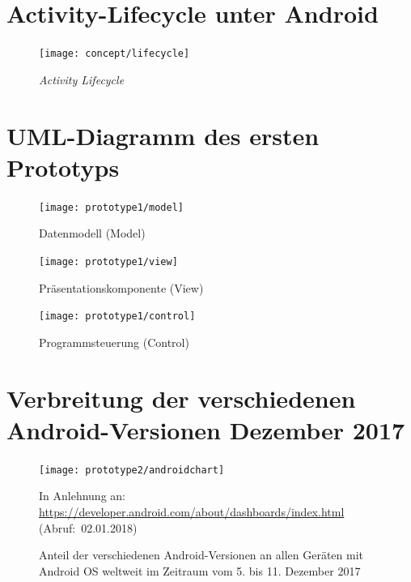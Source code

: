 \chapter{Activity-Lifecycle unter Android}
\begin{figure}[h]
  \centering
  \texttt{[image: concept/lifecycle]}
  \caption{\emph{Activity Lifecycle}}
  \label{fig:lifecycle}
\end{figure}

\chapter{UML-Diagramm des ersten Prototyps}\label{chap:uml}
\begin{figure}[h]
  \centering
  \texttt{[image: prototype1/model]}
  \caption{Datenmodell (Model)}
  \label{fig:model}
\end{figure}

\begin{figure}[h]
  \centering
  \texttt{[image: prototype1/view]}
  \caption{Präsentationskomponente (View)}
  \label{fig:view}
\end{figure}

\begin{figure}[h]
  \centering
  \texttt{[image: prototype1/control]}
  \caption{Programmsteuerung (Control)}
  \label{fig:control}
\end{figure}

\chapter{Verbreitung der verschiedenen Android-Versionen Dezember 2017}
\begin{figure}[h]
  \centering
  \texttt{[image: prototype2/androidchart]}
  \par\raggedleft\footnotesize In Anlehnung an: \url{https://developer.android.com/about/dashboards/index.html} (Abruf:~02.01.2018)
  \caption{Anteil der verschiedenen Android-Versionen an allen Geräten mit Android OS weltweit im Zeitraum vom 5. bis 11. Dezember 2017}
  \label{fig:versionchart}
\end{figure}

